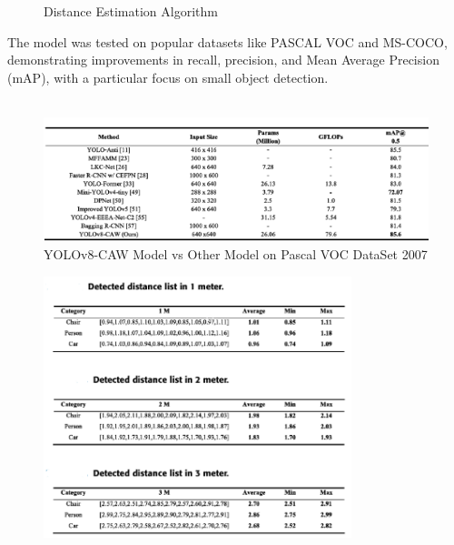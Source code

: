 {\begin{figure}[h!]
\end{figure}
%  
% 
\setlength{\fboxsep}{0pt} %
\setlength{\fboxrule}{1pt} %
%
%
\begin{figure}[h!]
    \centering
    \caption{Distance Estimation Algorithm}
\end{figure}
%
%
The model was tested on popular datasets like PASCAL VOC and MS-COCO, demonstrating improvements in recall, precision, and Mean Average Precision (mAP), with a particular focus on small object detection.\\\\
%
%
\begin{figure}[h!]
    \centering
    \includegraphics[width=1\textwidth]{images/YOLOv8-CAW vs Other Models.png}
    \caption{YOLOv8-CAW Model vs Other Model on Pascal VOC DataSet 2007}
\end{figure}
%
%
%
%
\begin{figure}[h!]
    \centering
    \includegraphics[width=0.8\textwidth]{images/Distance Estimation Result.png}

\end{figure}}
